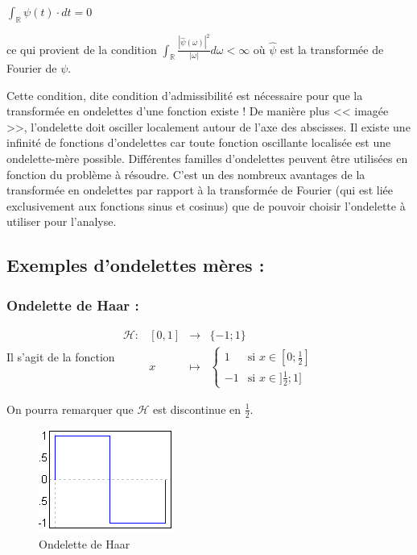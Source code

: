 \documentclass{article}
\begin{document}
$\int_{\mathbb{R}}\psi{}(t)\cdot{}dt = 0$

ce qui provient de la condition $\int_{\mathbb{R}} \frac{|\hat{\psi}(\omega)|^2}{|\omega|}d\omega < \infty$ où $\hat{\psi}$ est la transformée de Fourier de $\psi$.

Cette condition, dite condition d’admissibilité est nécessaire pour que la transformée en ondelettes d’une fonction existe !
De manière plus << imagée >>, l’ondelette doit osciller localement autour de l’axe des abscisses.
Il existe une infinité de fonctions d’ondelettes car toute fonction oscillante localisée est une ondelette-mère possible.
Différentes familles d’ondelettes peuvent être utilisées en fonction du problème à résoudre. C’est un des nombreux avantages de la transformée en ondelettes par rapport à la transformée de Fourier (qui est liée exclusivement aux fonctions sinus et cosinus) que de pouvoir choisir l’ondelette à utiliser pour l’analyse.


\subsection{Exemples d’ondelettes mères :}

\subsubsection{Ondelette de Haar :}

Il s'agit de la fonction $\begin{array}{lrcl}
\mathcal{H} : & [0,1] & \longrightarrow & \{-1;1\} \\
    & x & \longmapsto & \begin{cases}
   1 & \text{si } x \in [0;\frac{1}{2}] \\
   -1       & \text{si } x \in ]\frac{1}{2};1]
  \end{cases} \end{array}$
  
On pourra remarquer que $\mathcal{H}$ est discontinue en $\frac{1}{2}$.

\begin{figure}[!h]
\centering
\includegraphics[scale=1.1]{haar.png}
\caption{Ondelette de Haar}
\label{haar}
\end{figure}
\end{document}
